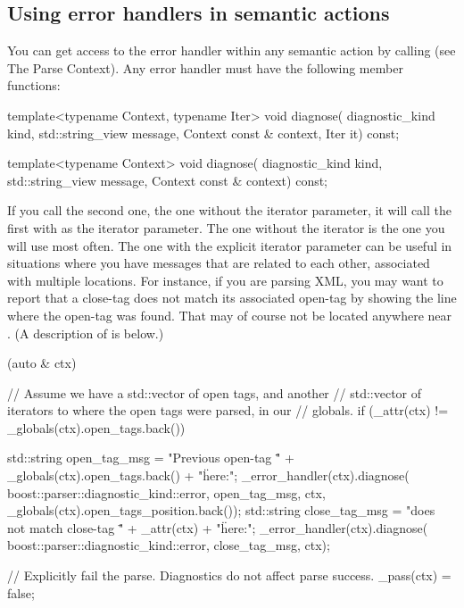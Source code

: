 \documentclass{MyBook}
\begin{document}
\subsection{Using error handlers in semantic actions}

You can get access to the error handler within any semantic action by calling  (see The Parse Context). Any error handler must have the following member functions:

\begin{code}
template<typename Context, typename Iter>
void diagnose(
    diagnostic_kind kind,
    std::string_view message,
    Context const & context,
    Iter it) const;
\end{code}

\begin{code}
template<typename Context>
void diagnose(
    diagnostic_kind kind,
    std::string_view message,
    Context const & context) const;
\end{code}

If you call the second one, the one without the iterator parameter, it will call the first with  as the iterator parameter. The one without the iterator is the one you will use most often. The one with the explicit iterator parameter can be useful in situations where you have messages that are related to each other, associated with multiple locations. For instance, if you are parsing XML, you may want to report that a close-tag does not match its associated open-tag by showing the line where the open-tag was found. That may of course not be located anywhere near . (A description of  is below.)

\begin{code}
[](auto & ctx) {
    // Assume we have a std::vector of open tags, and another
    // std::vector of iterators to where the open tags were parsed, in our
    // globals.
    if (_attr(ctx) != _globals(ctx).open_tags.back()) {
        std::string open_tag_msg =
            "Previous open-tag \"" + _globals(ctx).open_tags.back() + "\" here:";
        _error_handler(ctx).diagnose(
            boost::parser::diagnostic_kind::error,
            open_tag_msg,
            ctx,
            _globals(ctx).open_tags_position.back());
        std::string close_tag_msg =
            "does not match close-tag \"" + _attr(ctx) + "\" here:";
        _error_handler(ctx).diagnose(
            boost::parser::diagnostic_kind::error,
            close_tag_msg,
            ctx);

        // Explicitly fail the parse.  Diagnostics do not affect parse success.
        _pass(ctx) = false;
    }
}
\end{code}
\end{document}
